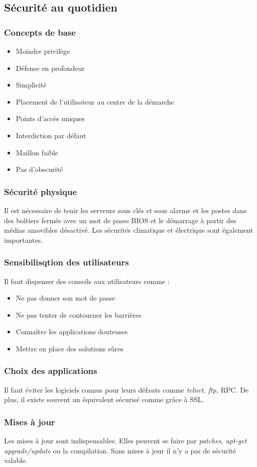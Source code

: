 \documentclass[12pt, a4paper]{article}
\begin{document}
	\subsection{Sécurité au quotidien}
	\subsubsection{Concepts de base}
	\begin{itemize}
		\item Moindre privilège
		\item Défense en profondeur
		\item Simplicité
		\item Placement de l'utilisateur au centre de la démarche
		\item Points d'accès uniques
		\item Interdiction par défaut
		\item Maillon faible
		\item Pas d'obscurité
	\end{itemize}
	\subsubsection{Sécurité physique}
	Il est nécessaire de tenir les serveurs sous clés et sous alarme et les postes
	 dans des boîtiers fermés avec un mot de passe BIOS et le démarrage à partir
	des médias amovibles désactivé. Les sécurités climatique et électrique sont
	également importantes.
	\subsubsection{Sensibilisqtion des utilisateurs}
	Il faut dispenser des conseils aux utilisateurs comme :
	\begin{itemize}
		\item Ne pas donner son mot de passe
		\item Ne pas tenter de contourner les barrières
		\item Connaître les applications douteuses
		\item Mettre en place des solutions sûres
	\end{itemize}
	\subsubsection{Choix des applications}
	Il faut éviter les logiciels connus pour leurs défauts comme \textit{telnet,
	ftp,} RPC. De plus, il existe souvent un équivalent sécurisé comme grâce à
	SSL.
	\subsubsection{Mises à jour}
	Les mises à jour sont indispensables. Elles peuvent se faire par
	\textit{patches, apt-get upgrade/update} ou la compilation. Sans mises à jour
	il n'y a pas de sécurité valable.
\end{document}
